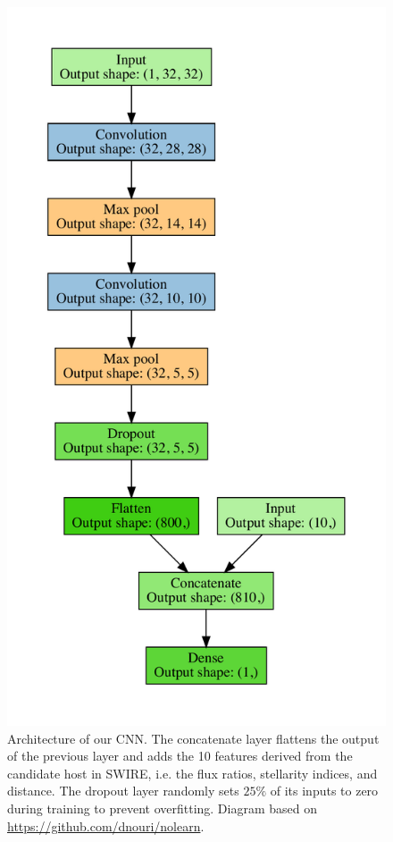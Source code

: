 \documentclass[fleqn,usenatbib,usedcolumn]{mnras}
\begin{document}
    \begin{figure}
      \includegraphics[width=\linewidth]{images/cnn_model_graph}
      \caption{Architecture of our CNN. The concatenate layer flattens the output of the previous layer and adds the 10 features derived from the candidate host in SWIRE, i.e. the flux ratios, stellarity indices, and distance. The dropout layer randomly sets $25\%$ of its inputs to zero during training to prevent overfitting. Diagram based on \url{ https://github.com/dnouri/nolearn}.}
      \label{fig:cnn}
    \end{figure}
\end{document}
